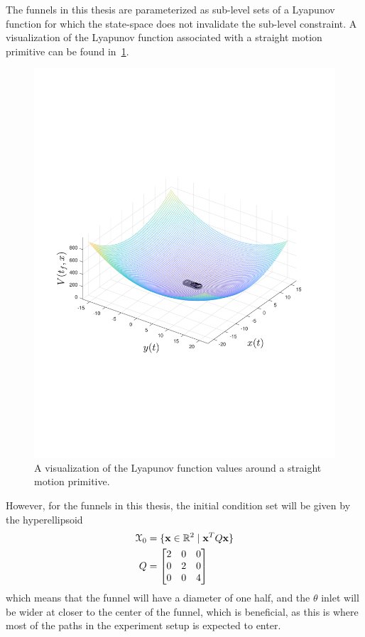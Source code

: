 The funnels in this thesis are parameterized as sub-level sets of a Lyapunov
function for which the state-space does not invalidate the sub-level constraint.
A visualization of the Lyapunov function associated with a straight motion
primitive can be found in~\cref{fig:visualized-lyapunov}.
\begin{figure}
  \centering \includegraphics[trim={3cm 7cm 3cm 7cm},
  scale=.6]{figures/rrtfunnel/straight-funnel-lyapunov-3d}
  \caption{A visualization of the Lyapunov function values around a straight
    motion primitive.}
  \label{fig:visualized-lyapunov}
\end{figure}

However, for the funnels in this thesis, the initial condition set will be given
by the hyperellipsoid
\begin{align}
  \mathcal{X}_0 &= \lbrace\mathsf{\mathbf{x}} \in \mathbb{R}^2 \mid \mathsf{\mathbf{x}}^{T} Q \mathsf{\mathbf{x}}\rbrace \\
   Q &= \begin{bmatrix}
      2 & 0 & 0 \\
      0 & 2 & 0 \\
      0 & 0 & 4
  \end{bmatrix}
\end{align}
which means that the funnel will have a diameter of one half, and the \(\theta\)
inlet will be wider at closer to the center of the funnel, which is beneficial,
as this is where most of the paths in the experiment setup is expected to enter.

